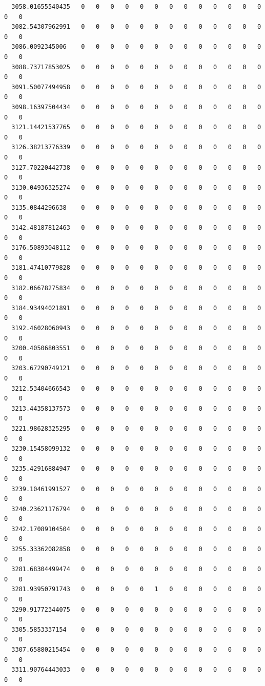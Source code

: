 \documentclass[
  letterpaper,
  DIV=11,
  numbers=noendperiod]{scrartcl}
\begin{document}
\begin{verbatim}
  3058.01655540435   0   0   0   0   0   0   0   0   0   0   0   0   0   0   0
  3082.54307962991   0   0   0   0   0   0   0   0   0   0   0   0   0   0   0
  3086.0092345006    0   0   0   0   0   0   0   0   0   0   0   0   0   0   0
  3088.73717853025   0   0   0   0   0   0   0   0   0   0   0   0   0   0   0
  3091.50077494958   0   0   0   0   0   0   0   0   0   0   0   0   0   0   0
  3098.16397504434   0   0   0   0   0   0   0   0   0   0   0   0   0   0   0
  3121.14421537765   0   0   0   0   0   0   0   0   0   0   0   0   0   0   0
  3126.38213776339   0   0   0   0   0   0   0   0   0   0   0   0   0   0   0
  3127.70220442738   0   0   0   0   0   0   0   0   0   0   0   0   0   0   0
  3130.04936325274   0   0   0   0   0   0   0   0   0   0   0   0   0   0   0
  3135.0844296638    0   0   0   0   0   0   0   0   0   0   0   0   0   0   0
  3142.48187812463   0   0   0   0   0   0   0   0   0   0   0   0   0   0   0
  3176.50893048112   0   0   0   0   0   0   0   0   0   0   0   0   0   0   0
  3181.47410779828   0   0   0   0   0   0   0   0   0   0   0   0   0   0   0
  3182.06678275834   0   0   0   0   0   0   0   0   0   0   0   0   0   0   0
  3184.93494021891   0   0   0   0   0   0   0   0   0   0   0   0   0   0   0
  3192.46028060943   0   0   0   0   0   0   0   0   0   0   0   0   0   0   0
  3200.40506803551   0   0   0   0   0   0   0   0   0   0   0   0   0   0   0
  3203.67290749121   0   0   0   0   0   0   0   0   0   0   0   0   0   0   0
  3212.53404666543   0   0   0   0   0   0   0   0   0   0   0   0   0   0   0
  3213.44358137573   0   0   0   0   0   0   0   0   0   0   0   0   0   0   0
  3221.98628325295   0   0   0   0   0   0   0   0   0   0   0   0   0   0   0
  3230.15458099132   0   0   0   0   0   0   0   0   0   0   0   0   0   0   0
  3235.42916884947   0   0   0   0   0   0   0   0   0   0   0   0   0   0   0
  3239.10461991527   0   0   0   0   0   0   0   0   0   0   0   0   0   0   0
  3240.23621176794   0   0   0   0   0   0   0   0   0   0   0   0   0   0   0
  3242.17089104504   0   0   0   0   0   0   0   0   0   0   0   0   0   0   0
  3255.33362082858   0   0   0   0   0   0   0   0   0   0   0   0   0   0   0
  3281.68304499474   0   0   0   0   0   0   0   0   0   0   0   0   0   0   0
  3281.93950791743   0   0   0   0   0   1   0   0   0   0   0   0   0   0   0
  3290.91772344075   0   0   0   0   0   0   0   0   0   0   0   0   0   0   0
  3305.5853337154    0   0   0   0   0   0   0   0   0   0   0   0   0   0   0
  3307.65880215454   0   0   0   0   0   0   0   0   0   0   0   0   0   0   0
  3311.90764443033   0   0   0   0   0   0   0   0   0   0   0   0   0   0   0
                  

\end{verbatim}
\end{document}
